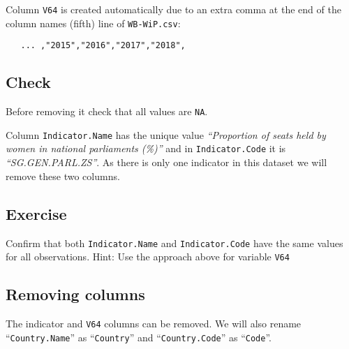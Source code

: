 \documentclass[a4paper,9pt,twocolumn,twoside,printwatermark=true]{pinp}
\begin{document}
Column \texttt{V64} is created automatically due to an extra comma at
the end of the column names (fifth) line of \texttt{WB-WiP.csv}:

\begin{verbatim}
   ... ,"2015","2016","2017","2018",
\end{verbatim}

\subsection{Check}\label{check}

Before removing it check that all values are \texttt{NA}.

\begin{Shaded}
\begin{Highlighting}[]
\end{Highlighting}
\end{Shaded}

Column \texttt{Indicator.Name} has the unique value \emph{``Proportion
of seats held by women in national parliaments (\%)''} and in
\texttt{Indicator.Code} it is \emph{``SG.GEN.PARL.ZS''}. As there is
only one indicator in this dataset we will remove these two columns.

\subsection{Exercise}\label{exercise-2}

Confirm that both \texttt{Indicator.Name} and \texttt{Indicator.Code}
have the same values for all observations. Hint: Use the approach above
for variable \texttt{V64}

\subsection{Removing columns}\label{removing-columns}

The indicator and \texttt{V64} columns can be removed. We will also
rename ``\texttt{Country.Name}'' as ``\texttt{Country}'' and
``\texttt{Country.Code}'' as ``\texttt{Code}''.

\begin{Shaded}
\begin{Highlighting}[]
\NormalTok{wip[, }\NormalTok{(}\NormalTok{, }\NormalTok{, }
        \NormalTok{)}\OperatorTok{:}\ErrorTok{=}\NormalTok{]}
\NormalTok{(}\NormalTok{, }\NormalTok{), }
              \NormalTok{(}\NormalTok{, }\NormalTok{))}
\NormalTok{(}
\NormalTok{(}
\end{Highlighting}
\end{Shaded}
\end{document}
